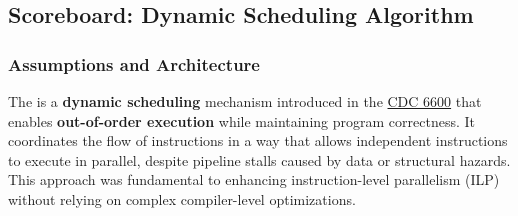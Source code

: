 \subsection{Scoreboard: Dynamic Scheduling Algorithm}

\subsubsection{Assumptions and Architecture}

The  is a \textbf{dynamic scheduling} mechanism introduced in the \href{https://en.wikipedia.org/wiki/CDC_6600}{CDC 6600} that enables \textbf{out-of-order execution} while maintaining program correctness. It coordinates the flow of instructions in a way that allows independent instructions to execute in parallel, despite pipeline stalls caused by data or structural hazards. This approach was fundamental to enhancing instruction-level parallelism (ILP) without relying on complex compiler-level optimizations.

